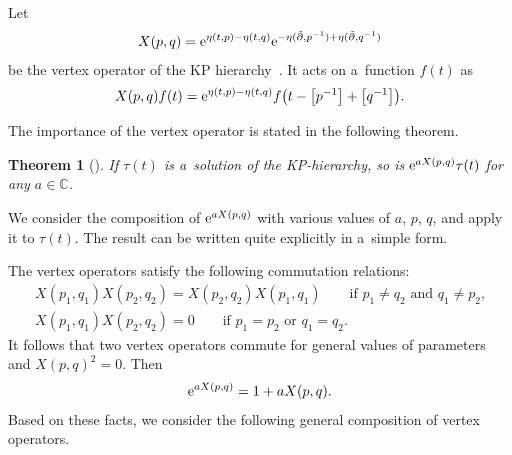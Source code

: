 \documentclass[10pt,a4paper]{amsart}
\numberwithin{equation}{section}
\newtheorem{Theorem}{Theorem}[section]
\theoremstyle{definition}
\begin{document}
Let
\begin{gather*}
X(p,q)={\rm e}^{\eta(t,p)-\eta(t,q)} {\rm e}^{-\eta(\tilde{\partial},p^{-1})+\eta(\tilde{\partial},q^{-1})}
\end{gather*}
be the vertex operator of the KP hierarchy~\cite{DJKM}.
It acts on a~function $f(t)$ as
\begin{gather}
X(p,q)f(t)={\rm e}^{\eta(t,p)-\eta(t,q)}f\bigl(t-\big[p^{-1}\big]+\big[q^{-1}\big]\bigr).
\label{action-X(p,q)}
\end{gather}

The importance of the vertex operator is stated in the following theorem.

\begin{Theorem}[\cite{DJKM}]
If $\tau(t)$ is a~solution of the KP-hierarchy, so is ${\rm e}^{aX(p,q)}\tau(t)$ for any
$a\in {\mathbb C}$.
\end{Theorem}

We consider the composition of ${\rm e}^{aX(p,q)}$ with various values of $a$, $p$, $q$, and
apply it to $\tau(t)$. The result can be written quite explicitly in a~simple form.

The vertex operators satisfy the following commutation relations:
\begin{gather*}
X(p_1,q_1)X(p_2,q_2)=X(p_2,q_2)X(p_1,q_1)
\qquad \text{if $p_1\neq q_2$ and $q_1\neq p_2$,} \\ X(p_1,q_1)X(p_2,q_2)=0
 \qquad \text{if $p_1=p_2$ or $q_1=q_2$}.
\end{gather*}
It follows that two vertex operators commute for general values
of parameters and $X(p,q)^2=0$. Then{\samepage
\begin{gather}
{\rm e}^{aX(p,q)}=1+aX(p,q).
\label{exp-X(p,q)}
\end{gather}
Based on these facts, we consider the following general composition of vertex operators.}
\end{document}
